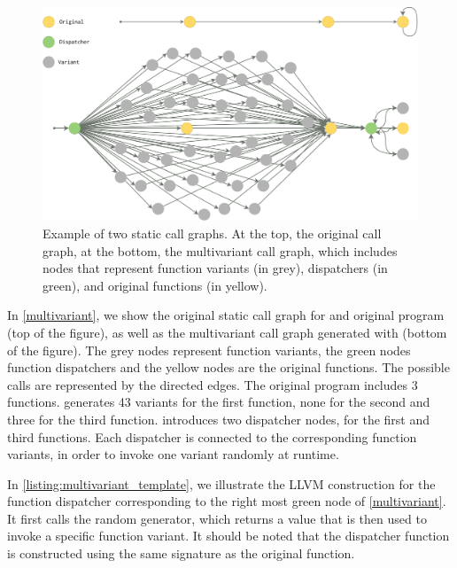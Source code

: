 \begin{figure}
    \centering
  \includegraphics[width=.8\linewidth]{diagrams/CFG.pdf}
  \caption{Example of two static call graphs. At the top, the original call graph, at the bottom, the multivariant call graph, which includes nodes that represent function variants (in grey), dispatchers (in green), and original functions  (in yellow).
}
  \label{multivariant}
\end{figure}

In \autoref{multivariant}, we show the original static call graph for and original program (top of the figure), as well as the multivariant call graph generated with \tool (bottom of the figure).
The grey nodes represent function variants, the green nodes function dispatchers and the yellow nodes are the original functions.
The possible calls are represented by the directed edges.
The original program includes 3 functions. \tool generates 43 variants for the first function, none for the second and three for the third function. 
\tool introduces two dispatcher nodes, for the first and third functions. Each dispatcher is connected to the corresponding function variants, in order to invoke one variant randomly at runtime.


In  \autoref{listing:multivariant_template}, we illustrate the LLVM construction for the function dispatcher corresponding to the right most green node of \autoref{multivariant}.
It first calls the random generator, which returns a value that is then used to invoke a specific function variant. It should be noted that the dispatcher function is constructed using the same signature as the original function. 


\lstset{
    language=llvm,
    basicstyle=\footnotesize\ttfamily,
    columns=fullflexible,
    breaklines=true,
    numbers=none,
    stepnumber=1,
    float
}

